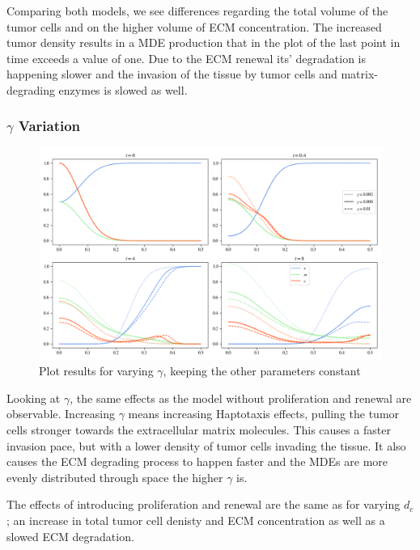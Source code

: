 Comparing both models, we see differences regarding the total volume of the tumor cells and on the higher volume of ECM concentration. The increased tumor density results in a MDE production that in the plot of the last point in time exceeds a value of one. Due to the ECM renewal its' degradation is happening slower and the invasion of the tissue by tumor cells and matrix-degrading enzymes is slowed as well.

\subsubsection*{$\gamma$ Variation}
\begin{figure}[h!]
    \centering
    \includegraphics[width=\textwidth]{resources/images/prolif_gamma_variation.png}
    \caption{Plot results for varying $\gamma$, keeping the other parameters constant}
    \label{fig:prolif_gamma_variation}
\end{figure}

Looking at $\gamma$, the same effects as the model without proliferation and renewal are observable. Increasing $\gamma$ means increasing Haptotaxis effects, pulling the tumor cells stronger towards the extracellular matrix molecules. This causes a faster invasion pace, but with a lower density of tumor cells invading the tissue. It also causes the ECM degrading process to happen faster and the MDEs are more evenly distributed through space the higher $\gamma$ is.

The effects of introducing proliferation and renewal are the same as for varying $d_c$; an increase in total tumor cell denisty and ECM concentration as well as a slowed ECM degradation. 

